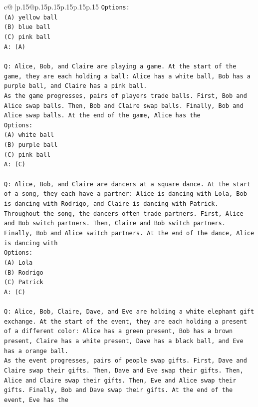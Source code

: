 \documentclass{article}
\begin{document}
{\begin{supertabular}{c@{$\;$}|p{.15\linewidth}@{}p{.15\linewidth}p{.15\linewidth}p{.15\linewidth}p{.15\linewidth}p{.15\linewidth}}
{{{\texttt{Options:} \\
\texttt{(A) yellow ball} \\
\texttt{(B) blue ball} \\
\texttt{(C) pink ball} \\
\texttt{A: (A)} \\
\\ 
\texttt{Q: Alice, Bob, and Claire are playing a game. At the start of the game, they are each holding a ball: Alice has a white ball, Bob has a purple ball, and Claire has a pink ball.} \\
\texttt{As the game progresses, pairs of players trade balls. First, Bob and Alice swap balls. Then, Bob and Claire swap balls. Finally, Bob and Alice swap balls. At the end of the game, Alice has the} \\
\texttt{Options:} \\
\texttt{(A) white ball} \\
\texttt{(B) purple ball} \\
\texttt{(C) pink ball} \\
\texttt{A: (C)} \\
\\ 
\texttt{Q: Alice, Bob, and Claire are dancers at a square dance. At the start of a song, they each have a partner: Alice is dancing with Lola, Bob is dancing with Rodrigo, and Claire is dancing with Patrick.} \\
\texttt{Throughout the song, the dancers often trade partners. First, Alice and Bob switch partners. Then, Claire and Bob switch partners. Finally, Bob and Alice switch partners. At the end of the dance, Alice is dancing with} \\
\texttt{Options:} \\
\texttt{(A) Lola} \\
\texttt{(B) Rodrigo} \\
\texttt{(C) Patrick} \\
\texttt{A: (C)} \\
\\ 
\texttt{Q: Alice, Bob, Claire, Dave, and Eve are holding a white elephant gift exchange. At the start of the event, they are each holding a present of a different color: Alice has a green present, Bob has a brown present, Claire has a white present, Dave has a black ball, and Eve has a orange ball.} \\
\texttt{As the event progresses, pairs of people swap gifts. First, Dave and Claire swap their gifts. Then, Dave and Eve swap their gifts. Then, Alice and Claire swap their gifts. Then, Eve and Alice swap their gifts. Finally, Bob and Dave swap their gifts. At the end of the event, Eve has the} \\
}}}
\end{supertabular}}
\end{document}
